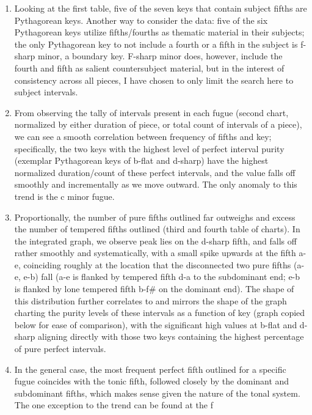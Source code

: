 \begin{enumerate}
\def\labelenumi{\arabic{enumi}.}
\tightlist
\item
  Looking at the first table, five of the seven keys that contain
  subject fifths are Pythagorean keys. Another way to consider the data:
  five of the six Pythagorean keys utilize fifths/fourths as thematic
  material in their subjects; the only Pythagorean key to not include a
  fourth or a fifth in the subject is f-sharp minor, a boundary key.
  F-sharp minor does, however, include the fourth and fifth as salient
  countersubject material, but in the interest of consistency across all
  pieces, I have chosen to only limit the search here to subject
  intervals.
\item
  From observing the tally of intervals present in each fugue (second
  chart, normalized by either duration of piece, or total count of
  intervals of a piece), we can see a smooth correlation between
  frequency of fifths and key; specifically, the two keys with the
  highest level of perfect interval purity (exemplar Pythagorean keys of
  b-flat and d-sharp) have the highest normalized duration/count of
  these perfect intervals, and the value falls off smoothly and
  incrementally as we move outward. The only anomaly to this trend is
  the c minor fugue.
\item
  Proportionally, the number of pure fifths outlined far outweighs and
  excess the number of tempered fifths outlined (third and fourth table
  of charts). In the integrated graph, we observe peak lies on the
  d-sharp fifth, and falls off rather smoothly and systematically, with
  a small spike upwards at the fifth a-e, coinciding roughly at the
  location that the disconnected two pure fifths (a-e, e-b) fall (a-e is
  flanked by tempered fifth d-a to the subdominant end; e-b is flanked
  by lone tempered fifth b-f\# on the dominant end). The shape of this
  distribution further correlates to and mirrors the shape of the graph
  charting the purity levels of these intervals as a function of key
  (graph copied below for ease of comparison), with the significant high
  values at b-flat and d-sharp aligning directly with those two keys
  containing the highest percentage of pure perfect intervals.
\item
  In the general case, the most frequent perfect fifth outlined for a
  specific fugue coincides with the tonic fifth, followed closely by the
  dominant and subdominant fifths, which makes sense given the nature of
  the tonal system. The one exception to the trend can be found at the f

\end{enumerate}
